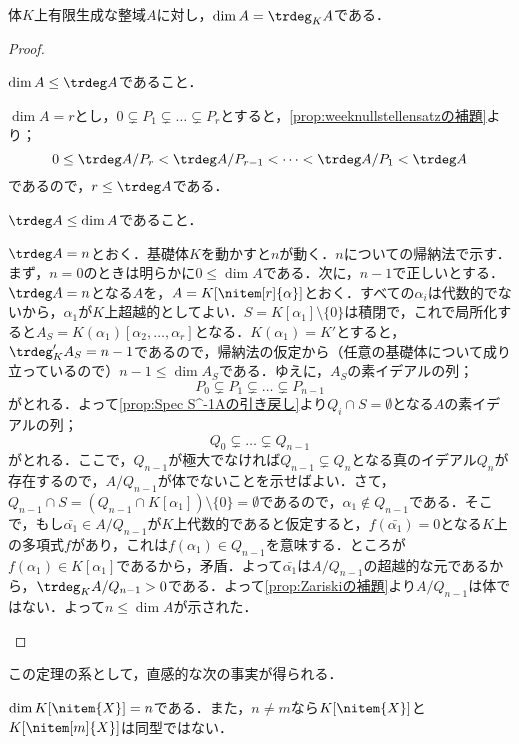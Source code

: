 \begin{thm}
	体$K$上有限生成な整域$A$に対し，$\dim A=\trdeg_K A$である．
\end{thm}
\begin{proof}
	\begin{step}
		\item $\dim A\leq\trdeg A$であること．
		
		$\dim A=r$とし，$0\subsetneq P _1\subsetneq\dots\subsetneq P _r$とすると，\ref{prop:weeknullstellensatzの補題}より；
		\[0\leq\trdeg A/ P _r<\trdeg A/ P _{r-1}<\dots<\trdeg A/ P _1<\trdeg A\]
		であるので，$r\leq\trdeg A$である．
		
		\item $\trdeg A\leq\dim A$であること．
		
		$\trdeg A=n$とおく．基礎体$K$を動かすと$n$が動く．$n$についての帰納法で示す．まず，$n=0$のときは明らかに$0\leq\dim A$である．次に，$n-1$で正しいとする．$\trdeg A=n$となる$A$を，$A=K[\nitem[r]{\alpha}]$とおく．すべての$\alpha_i$は代数的でないから，$\alpha_1$が$K$上超越的としてよい．$S=K[\alpha_1]\setminus\{0\}$は積閉で，これで局所化すると$A_S=K(\alpha_1)[\alpha_2,\dots,\alpha_r]$となる．$K(\alpha_1)=K'$とすると，$\trdeg_K' A_S=n-1$であるので，帰納法の仮定から（任意の基礎体について成り立っているので）$n-1\leq\dim A_S$である．ゆえに，$A_S$の素イデアルの列；
		\[ P _0\subsetneq P _1\subsetneq\dots\subsetneq P _{n-1}\]
		がとれる．よって\ref{prop:Spec S^-1Aの引き戻し}より$ Q _i\cap S=\emptyset$となる$A$の素イデアルの列；
		\[ Q _0\subsetneq\dots\subsetneq Q _{n-1}\]
		がとれる．ここで，$ Q _{n-1}$が極大でなければ$ Q _{n-1}\subsetneq Q _n$となる真のイデアル$ Q _n$が存在するので，$A/ Q _{n-1}$が体でないことを示せばよい．さて，$ Q _{n-1}\cap S=( Q _{n-1}\cap K[\alpha_1])\setminus\{0\}=\emptyset$であるので，$\alpha_1\not\in Q _{n-1}$である．そこで，もし$\bar{\alpha_1}\in A/ Q _{n-1}$が$K$上代数的であると仮定すると，$f(\bar{\alpha_1})=0$となる$K$上の多項式$f$があり，これは$f(\alpha_1)\in Q _{n-1}$を意味する．ところが$f(\alpha_1)\in K[\alpha_1]$であるから，矛盾．よって$\bar{\alpha_1}$は$A/ Q _{n-1}$の超越的な元であるから，$\trdeg_K A/ Q _{n-1}>0$である．よって\ref{prop:Zariskiの補題}より$A/ Q _{n-1}$は体ではない．よって$n\leq\dim A$が示された．
	\end{step}
\end{proof}

この定理の系として，直感的な次の事実が得られる．
\begin{cor}\label{cor:多項式環の次元}
	$\dim K[\nitem{X}]=n$である．また，$n\neq m$なら$K[\nitem{X}]$と$K[\nitem[m]{X}]$は同型ではない．
\end{cor}

